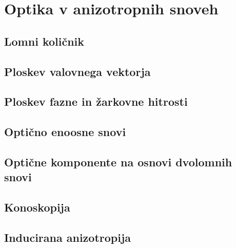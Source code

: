 
\chapter{Optika v anizotropnih snoveh}

\section{Lomni količnik}
\section{Ploskev valovnega vektorja}
\section{Ploskev fazne in žarkovne hitrosti}
\section{Optično enoosne snovi}
\section{Optične komponente na osnovi dvolomnih snovi}
\section{Konoskopija}
\section{Inducirana anizotropija}
